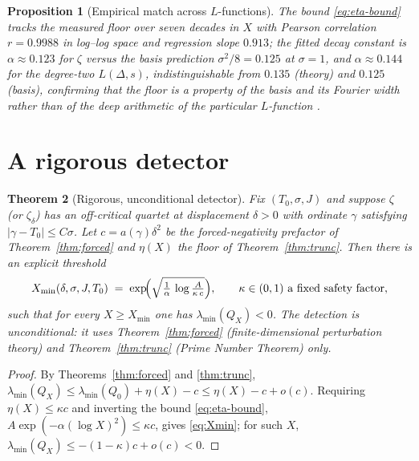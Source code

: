 \documentclass[11pt]{amsart}
\newtheorem{theorem}{Theorem}[section]
\newtheorem{proposition}[theorem]{Proposition}
\theoremstyle{definition}
\theoremstyle{remark}
\newcommand{\lmin}{\lambda_{\min}}
\newcommand{\Qzero}{Q_{0}}
\begin{document}
\begin{proposition}[Empirical match across $L$-functions]\label{prop:eta-emp}
The bound \eqref{eq:eta-bound} tracks the measured floor over seven decades
in $X$ with Pearson correlation $r=0.9988$ in log--log space and regression
slope $0.913$; the fitted decay constant is $\alpha\approx0.123$ for $\zeta$
versus the basis prediction $\sigma^2/8=0.125$ at $\sigma=1$, and
$\alpha\approx0.144$ for the degree-two $L(\Delta,s)$, indistinguishable
from $0.135$ (theory) and $0.125$ (basis), confirming that the floor is a
property of the basis and its Fourier width rather than of the deep
arithmetic of the particular $L$-function \cite{TrejoV8}.
\end{proposition}

\section{A rigorous detector}\label{sec:detector}

\begin{theorem}[Rigorous, unconditional detector]\label{thm:detector}
Fix $(T_0,\sigma,J)$ and suppose $\zeta$ (or $\zeta_\delta$) has an
off-critical quartet at displacement $\delta>0$ with ordinate $\gamma$
satisfying $|\gamma-T_0|\le C\sigma$. Let $c=a(\gamma)\delta^2$ be the
forced-negativity prefactor of Theorem~\ref{thm:forced} and $\eta(X)$ the
floor of Theorem~\ref{thm:trunc}. Then there is an explicit threshold
\begin{equation}\label{eq:Xmin}
  X_{\min}(\delta,\sigma,J,T_0)
  \;=\;\exp\!\Bigl(\sqrt{\tfrac1\alpha\,\log\tfrac{A}{\kappa\,c}}\Bigr),
  \qquad \kappa\in(0,1)\text{ a fixed safety factor},
\end{equation}
such that for every $X\ge X_{\min}$ one has $\lmin(Q_X)<0$. The detection is
unconditional: it uses Theorem~\ref{thm:forced} (finite-dimensional
perturbation theory) and Theorem~\ref{thm:trunc} (Prime Number Theorem)
only.
\end{theorem}

\begin{proof}
By Theorems~\ref{thm:forced} and \ref{thm:trunc},
$\lmin(Q_X)\le\lmin(\Qzero)+\eta(X)-c\le \eta(X)-c+o(c)$. Requiring
$\eta(X)\le\kappa c$ and inverting the bound \eqref{eq:eta-bound},
$A\exp(-\alpha(\log X)^2)\le\kappa c$, gives \eqref{eq:Xmin}; for such $X$,
$\lmin(Q_X)\le-(1-\kappa)c+o(c)<0$.
\end{proof}
\end{document}
